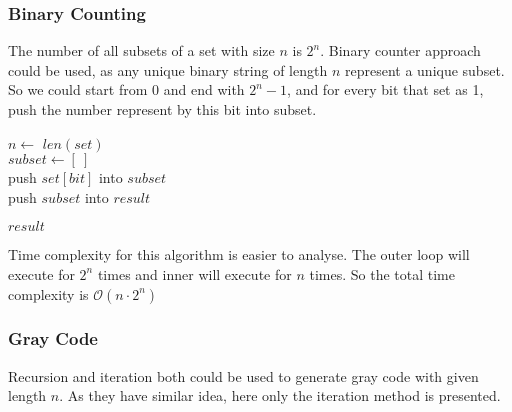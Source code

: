 \documentclass[catalog.tex]{subfiles}
\begin{document}
\subsubsection{Binary Counting}
The number of all subsets of a set with size $n$ is $2^n$. Binary counter approach could be used, as any unique binary string of length $n$ represent a unique subset. So we could start from $0$ and end with $2^n - 1$, and for every bit that set as 1, push the number represent by this bit into subset. 
\begin{Algorithm}
	\BlankLine
	\BlankLine
$n \leftarrow$ $len(set)$ \\	
	{
$subset \leftarrow [\ ]$ \\
	{
	 {
	push $set[bit]$ into $subset$  \\  
	}
	}
	push $subset$ into $result$ \\
}	

\Ret $result$
\end{Algorithm}

Time complexity for this algorithm is easier to analyse. The outer loop will execute for $2^n$ times and inner will execute for $n$ times. So the total time complexity is $\mathcal{O}(n\cdot 2^n)$

\subsubsection{Gray Code}
Recursion and iteration both could be used to generate gray code with given length $n$. As they have similar idea, here only the iteration method is presented. 
\end{document}
